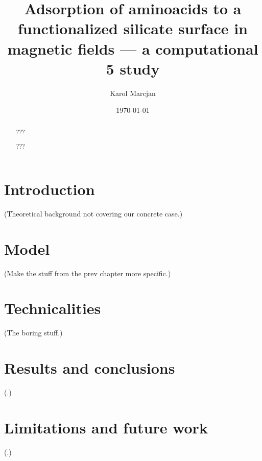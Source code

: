 \documentclass[a4paper,oneside,draft,11pt]{memoir}
\title{
    Adsorption of aminoacids to a functionalized silicate surface in magnetic
    fields --- a computational 5 study
}
\author{Karol Marcjan}
\date{\today}
\begin{document}
\maketitle

\newpage
\begin{abstract}
    ???
\end{abstract}
\begin{otherlanguage}{polish}
\begin{abstract}
    ???
\end{abstract}
\end{otherlanguage}

\newpage
\tableofcontents*

\mainmatter


\chapter{Introduction}

(Theoretical background not covering our concrete case.)



\chapter{Model}

(Make the stuff from the prev chapter more specific.)



\chapter{Technicalities}

(The boring stuff.)




\chapter{Results and conclusions}

(.)



\chapter{Limitations and future work}

(.)



{}

\end{document}

